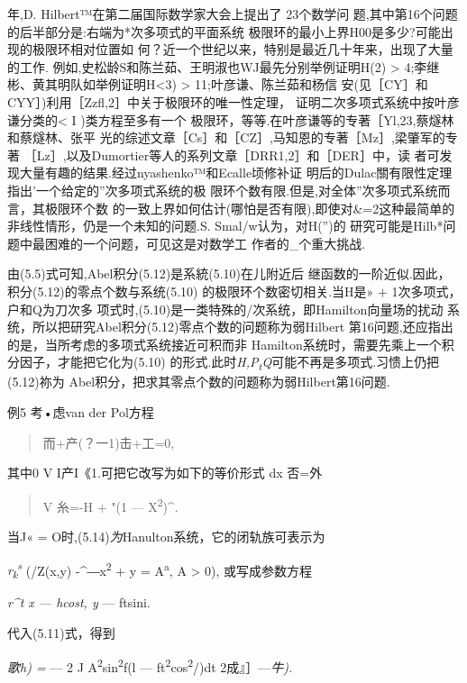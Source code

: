 \documentclass{article}
\begin{document}
年,D. Hilbert™在第二届国际数学家大会上提出了 23个数学问
题,其中第16个问题的后半部分是:右端为*次多项式的平面系统
极限环的最小上界H00是多少?可能出现的极限环相对位置如
何？近一个世纪以来，特别是最近几十年来，出现了大量的工作.
例如,史松龄S和陈兰茹、王明淑也WJ最先分别举例证明H(2) \textgreater{}
4;李继彬、黄其明队如举例证明H\textless{}3) \textgreater{}
11;叶彦谦、陈兰茹和杨信
安(见［CY］和CYY］)利用［Zzfl,2］中关于极限环的唯一性定理，
证明二次多项式系统中按叶彦谦分类的\textless{} I )类方程至多有一个
极限环，等等.在叶彦谦等的专著［Yl,23,蔡燧林和蔡燧林、张平
光的综述文章［Cs］和［CZ］,马知恩的专著［Mz］,梁肇军的专著
［Lz］,以及Dumortier等人的系列文章［DRR1,2］和［DER］中，读
者可发现大量有趣的结果.经过nyashenko™和Ecalle顷修补证
明后的Dulac關有限性定理指出'一个给定的''次多项式系统的极
限环个数有限.但是,对全体''次多项式系统而言，其极限环个数
的一致上界如何估计(哪怕是否有限),即使对\&=2这种最简单的
非线性情形，仍是一个未知的问题.S. Smal/w认为，对H('')的
研究可能是Hilb*问题中最困难的一个问题，可见这是对数学工
作者的\_个重大挑战.

由(5.5)式可知,Abel积分(5.12)是系統(5.10)在儿附近后
继函数的一阶近似.因此，积分(5.12)的零点个数与系统(5.10)
的极限环个数密切相关.当H是» + 1次多项式，户和Q为刀次多
项式时,(5.10)是一类特殊的/次系统，即Hamilton向量场的扰动
系统，所以把研究Abel积分(5.12)零点个数的问题称为弱Hilbert
第16问题,还应指出的是，当所考虑的多项式系统接近可积而非
Hamilton系统时，需要先乘上一个积分因子，才能把它化为(5.10)
的形式.此时\emph{H,P\textsubscript{t}Q}可能不再是多项式.习愦上仍把(5.12)祢为
Abel积分，把求其零点个数的问题称为弱Hilbert第16问题.

例5 考•虑van der Pol方程

\begin{quote}
而+产(？一1)击+工=0,
\end{quote}

其中0 V I产I《1.可把它改写为如下的等价形式 dx 否=外

\begin{quote}
V 糸=-H + "(1 --- X\textsuperscript{2})\^{}.
\end{quote}

当J« = O时,(5.14)\emph{为}Hanulton系统，它的闭轨族可表示为

\emph{r\textsubscript{k}\textsuperscript{s}} (/Z(x,y)
-\^{}―x\textsuperscript{2} + y = A\textsuperscript{a}, A \textgreater{}
0), 或写成参数方程

\emph{r\^{}t x --- hcost, y} --- ftsini.

代入(5.11)式，得到

\emph{歌h) =} --- 2 J A\textsuperscript{2}sin\textsuperscript{2}f(l ---
ft\textsuperscript{2}cos\textsuperscript{2}/)dt 2成』］---\emph{牛).}
\end{document}
